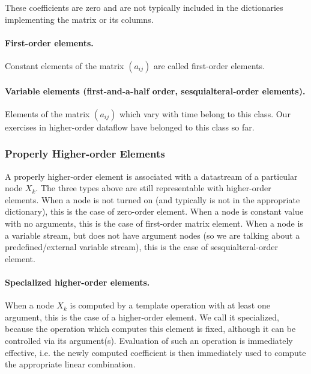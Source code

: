 \documentclass[withtimes]{easychair}
\begin{document}
These coefficients are zero and are not typically included in the dictionaries implementing the matrix or its columns.

\paragraph{First-order elements.} Constant elements of the matrix $(a_{ij})$ are called first-order elements.

\paragraph{Variable elements (first-and-a-half order, sesquialteral-order elements).} Elements of the matrix $(a_{ij})$ which vary with
time belong to this class. Our exercises in higher-order dataflow have belonged to this class so far.

\subsubsection{Properly Higher-order Elements}

A properly higher-order element is associated with a datastream of a particular node $X_k$. The three types
above are still representable with higher-order elements. When a node is not turned on (and typically is
not in the appropriate dictionary), this is the case of zero-order element. When a node is constant value
with no arguments, this is the case of first-order matrix element. When a node is a variable stream, but does not
have argument nodes (so we are talking about a predefined/external variable stream), this is the case of sesquialteral-order element.

\paragraph{Specialized higher-order elements.}

When a node $X_k$ is computed by a template operation with at least one argument, this is the
case of a higher-order element. We call it specialized, because the operation which computes
this element is fixed, although it can be controlled via its argument(s). Evaluation of such an operation is immediately
effective, i.e. the newly computed coefficient is then immediately used to compute the
appropriate linear combination.
\end{document}
